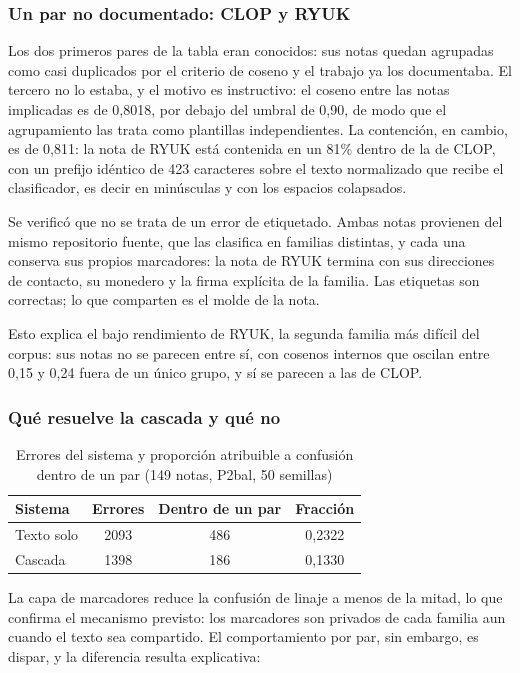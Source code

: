 \subsubsection*{Un par no documentado: CLOP y RYUK}

Los dos primeros pares de la tabla eran conocidos: sus notas quedan agrupadas como casi duplicados por el criterio de coseno y el trabajo ya los documentaba. El tercero no lo estaba, y el motivo es instructivo: el coseno entre las notas implicadas es de 0,8018, por debajo del umbral de 0,90, de modo que el agrupamiento las trata como plantillas independientes. La contención, en cambio, es de 0,811: la nota de RYUK está contenida en un 81\% dentro de la de CLOP, con un prefijo idéntico de 423 caracteres sobre el texto normalizado que recibe el clasificador, es decir en minúsculas y con los espacios colapsados.

Se verificó que no se trata de un error de etiquetado. Ambas notas provienen del mismo repositorio fuente, que las clasifica en familias distintas, y cada una conserva sus propios marcadores: la nota de RYUK termina con sus direcciones de contacto, su monedero y la firma explícita de la familia. Las etiquetas son correctas; lo que comparten es el molde de la nota.

Esto explica el bajo rendimiento de RYUK, la segunda familia más difícil del corpus: sus notas no se parecen entre sí, con cosenos internos que oscilan entre 0,15 y 0,24 fuera de un único grupo, y sí se parecen a las de CLOP.

\subsubsection*{Qué resuelve la cascada y qué no}

\begin{table}[ht]
\centering
\caption{Errores del sistema y proporción atribuible a confusión dentro de un par (149 notas, P2bal, 50 semillas)}
\label{tab:confusion_linaje}
\begin{tabular}{|l|c|c|c|}
\hline
\textbf{Sistema} & \textbf{Errores} & \textbf{Dentro de un par} & \textbf{Fracción} \\
\hline
Texto solo & 2093 & 486 & 0,2322 \\
Cascada & 1398 & 186 & 0,1330 \\
\hline
\end{tabular}
\end{table}

La capa de marcadores reduce la confusión de linaje a menos de la mitad, lo que confirma el mecanismo previsto: los marcadores son privados de cada familia aun cuando el texto sea compartido. El comportamiento por par, sin embargo, es dispar, y la diferencia resulta explicativa:

